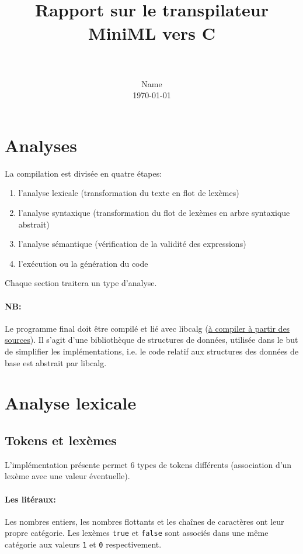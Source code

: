 \documentclass[paper=a4, fontsize=11pt]{scrartcl}
\title{
		\vspace{-1in} 	
		\usefont{OT1}{bch}{b}{n}
		\horrule{0.5pt} \\[0.4cm]
		\huge Rapport sur le transpilateur MiniML vers C \\
		\horrule{2pt} \\[0.5cm]
}
\author{
		\normalfont 								\normalsize
        Name \\[-3pt]		\normalsize
        \today
}
\date{}
\numberwithin{equation}{section}		%
\numberwithin{figure}{section}			%
\numberwithin{table}{section}				%
\begin{document}
\maketitle

\tableofcontents

\newpage
\section{Analyses}

La compilation est divisée en quatre étapes:

\begin{enumerate}
\item l'analyse lexicale (transformation du texte en flot de lexèmes)
\item l'analyse syntaxique (transformation du flot de lexèmes en arbre syntaxique abstrait)
\item l'analyse sémantique (vérification de la validité des expressions)
\item l'exécution ou la génération du code
\end{enumerate} 

Chaque section traitera un type d'analyse.

\paragraph{NB:}
Le programme final doit être compilé et lié avec libcalg (\href{https://github.com/fragglet/c-algorithms}{à compiler à partir des sources}).
Il s'agit d'une bibliothèque de structures de données, utilisée dans le but de simplifier les implémentations, i.e. le code relatif aux structures des données de base est abstrait par libcalg.

\newpage
\section{Analyse lexicale}

\subsection{Tokens et lexèmes}

L'implémentation présente permet 6 types de tokens différents (association d'un lexème avec une valeur éventuelle).

\paragraph{Les litéraux:}
Les nombres entiers, les nombres flottants et les chaînes de caractères ont leur propre catégorie.
Les lexèmes \texttt{true} et \texttt{false} sont associés dans une même catégorie aux valeurs \texttt{1} et \texttt{0} respectivement.
\end{document}
